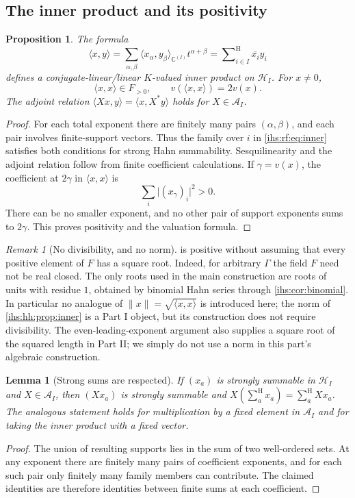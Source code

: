 \documentclass[11pt,a4paper]{article}
\numberwithin{equation}{section}
\newtheorem{proposition}[proposition]{Proposition}
\newtheorem{lemma}[lemma]{Lemma}
\theoremstyle{definition}
\theoremstyle{remark}
\newtheorem{remark}[remark]{Remark}
\newcommand{\C}{\mathbb C}
\newcommand{\K}{K}
\newcommand{\Fld}{F}
\newcommand{\Hrf}{\mathcal H_I}
\newcommand{\Arf}{\mathcal A_I}
\newcommand{\sH}{\mathop{\sum}\nolimits^{\mathrm H}}
\newcommand{\abs}[1]{\lvert#1\rvert}
\newcommand{\norm}[1]{\lVert#1\rVert}
\newcommand{\ip}[2]{\langle#1,#2\rangle}
\begin{document}
\subsection{The inner product and its positivity}\label{ihs:rf:sec:inner}

\begin{proposition}\label{ihs:rf:prop:inner}
The formula
\begin{equation}\label{ihs:rf:eq:inner}
 \ip{x}{y}
 =\sum_{\alpha,\beta}\ip{x_\alpha}{y_\beta}_{\C^{(I)}}t^{\alpha+\beta}
 =\sH_{i\in I}\overline{x_i}y_i
\end{equation}
defines a conjugate-linear/linear $\K$-valued inner product on $\Hrf$.
For $x\ne0$,
\[
 \ip{x}{x}\in\Fld_{>0},\qquad v(\ip{x}{x})=2v(x).
\]
The adjoint relation $\ip{Xx}{y}=\ip{x}{X^*y}$ holds for $X\in\Arf$.
\end{proposition}
\begin{proof}
For each total exponent there are finitely many pairs $(\alpha,\beta)$, and
each pair involves finite-support vectors. Thus the family over $i$ in
\eqref{ihs:rf:eq:inner} satisfies both conditions for strong Hahn
summability. Sesquilinearity and the adjoint relation follow from finite
coefficient calculations. If $\gamma=v(x)$, the coefficient at $2\gamma$ in
$\ip{x}{x}$ is
\[
 \sum_i \abs{(x_\gamma)_i}^2>0.
\]
There can be no smaller exponent, and no other pair of support exponents
sums to $2\gamma$. This proves positivity and the valuation formula.
\end{proof}

\begin{remark}[No divisibility, and no norm]\label{ihs:rf:rem:nodiv}
 is positive without assuming that every positive
element of $\Fld$ has a square root. Indeed, for arbitrary $\Gamma$ the
field $\Fld$ need not be real closed. The only roots used in the main
construction are roots of units with residue $1$, obtained by binomial Hahn
series through \cref{ihs:cor:binomial}. In particular no analogue of
$\norm{x}=\sqrt{\ip{x}{x}}$ is introduced here; the norm of
\cref{ihs:hh:prop:inner} is a Part I object, but its construction does
not require divisibility. The even-leading-exponent argument also supplies
a square root of the squared length in Part II; we simply do not use a norm
in this part's algebraic construction.
\end{remark}

\begin{lemma}[Strong sums are respected]\label{ihs:rf:lem:strongaction}
If $(x_a)$ is strongly summable in $\Hrf$ and $X\in\Arf$, then $(Xx_a)$ is
strongly summable and $X(\sH_a x_a)=\sH_a Xx_a$. The analogous statement
holds for multiplication by a fixed element in $\Arf$ and for taking the
inner product with a fixed vector.
\end{lemma}
\begin{proof}
The union of resulting supports lies in the sum of two well-ordered sets. At
any exponent there are finitely many pairs of coefficient exponents, and for
each such pair only finitely many family members can contribute. The claimed
identities are therefore identities between finite sums at each coefficient.
\end{proof}
\end{document}
